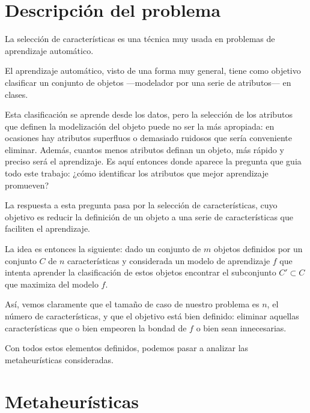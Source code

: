 \documentclass[a4paper, 11pt, titlepage]{article}
\begin{document}
    \maketitle

    \tableofcontents
    \newpage


    \section{Descripción del problema}
    La selección de características es una técnica muy usada en problemas de aprendizaje automático.

    El aprendizaje automático, visto de una forma muy general, tiene como objetivo clasificar un conjunto de objetos ---modelador por una serie de atributos--- en clases.

    Esta clasificación se aprende desde los datos, pero la selección de los atributos que definen la modelización del objeto puede no ser la más apropiada: en ocasiones hay atributos superfluos o demasiado ruidosos que sería conveniente eliminar. Además, cuantos menos atributos definan un objeto, más rápido y preciso será el aprendizaje. Es aquí entonces donde aparece la pregunta que guia todo este trabajo: ¿cómo identificar los atributos que mejor aprendizaje promueven?

    La respuesta a esta pregunta pasa por la selección de características, cuyo objetivo es reducir la definición de un objeto a una serie de características que faciliten el aprendizaje.

    La idea es entonces la siguiente: dado un conjunto de $m$ objetos definidos por un conjunto $C$ de $n$ características y considerada un modelo de aprendizaje $f$ que intenta aprender la clasificación de estos objetos encontrar el subconjunto $C' \subset C$ que maximiza del modelo $f$.

    Así, vemos claramente que el tamaño de caso de nuestro problema es $n$, el número de características, y que el objetivo está bien definido: eliminar aquellas características que o bien empeoren la bondad de $f$ o bien sean innecesarias.

    Con todos estos elementos definidos, podemos pasar a analizar las metaheurísticas consideradas.

    \section{Metaheurísticas}
\end{document}
